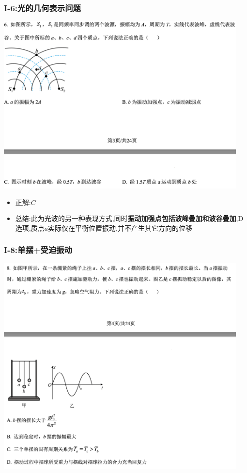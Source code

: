 \documentclass{article}
\begin{document}
\subsubsection{I-6:光的几何表示问题}
\includegraphics[width=0.95\textwidth,keepaspectratio]{./pictures/1.4-1.png}

\begin{itemize}
    \item 正解:\quad $C$
    \item 总结:\quad 此为光波的另一种表现方式,同时\textbf{振动加强点包括波峰叠加和波谷叠加},D选项,质点$a$实际仅在平衡位置振动,并不产生其它方向的位移
\end{itemize}

\vspace{2em}


\subsubsection{I-8:单摆+受迫振动}
\includegraphics[width=0.95\textwidth,keepaspectratio]{./pictures/1.4-2.png}
\end{document}
